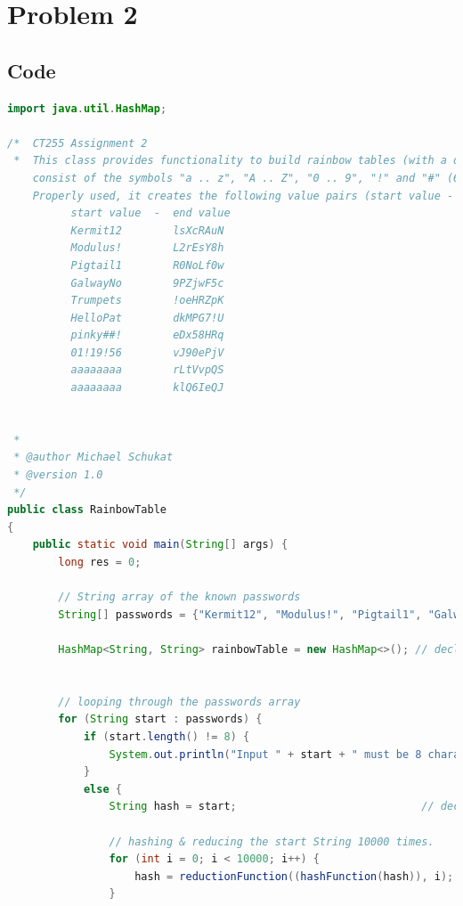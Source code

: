 \documentclass[a4paper]{article}
\begin{document}
\bigskip


\section{Problem 2}
\subsection{Code}
\begin{lstlisting}[language=java]
import java.util.HashMap;

/*  CT255 Assignment 2
 *  This class provides functionality to build rainbow tables (with a different reduction function per round) for 8 character long strings, which
    consist of the symbols "a .. z", "A .. Z", "0 .. 9", "!" and "#" (64 symbols in total).
    Properly used, it creates the following value pairs (start value - end value) after 10,000 iterations of hashFunction() and reductionFunction():
          start value  -  end value
          Kermit12        lsXcRAuN
          Modulus!        L2rEsY8h
          Pigtail1        R0NoLf0w
          GalwayNo        9PZjwF5c
          Trumpets        !oeHRZpK
          HelloPat        dkMPG7!U
          pinky##!        eDx58HRq
          01!19!56        vJ90ePjV
          aaaaaaaa        rLtVvpQS
          aaaaaaaa        klQ6IeQJ
          
          
 *
 * @author Michael Schukat
 * @version 1.0
 */
public class RainbowTable
{
    public static void main(String[] args) {
		long res = 0;

        // String array of the known passwords
        String[] passwords = {"Kermit12", "Modulus!", "Pigtail1", "GalwayNo", "Trumpets", "HelloPat", "pinky##!", "01!19!56", "aaaaaaaa", "aaaaaaaa"};

        HashMap<String, String> rainbowTable = new HashMap<>(); // declaring a HashTable that i'll use to store the password : hash pairs


        // looping through the passwords array
		for (String start : passwords) {
            if (start.length() != 8) {
                System.out.println("Input " + start + " must be 8 characters long - Exit");
            }
            else {
                String hash = start;                             // declaring a String hash that will hold the final reduced hash of a given password

                // hashing & reducing the start String 10000 times.
                for (int i = 0; i < 10000; i++) {
                    hash = reductionFunction((hashFunction(hash)), i);
                }


\end{lstlisting}
\end{document}
